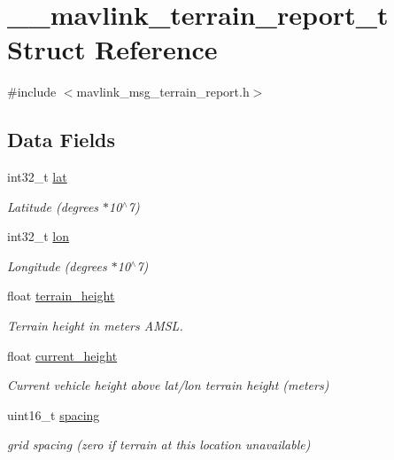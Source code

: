 \hypertarget{struct____mavlink__terrain__report__t}{\section{\+\_\+\+\_\+mavlink\+\_\+terrain\+\_\+report\+\_\+t Struct Reference}
\label{struct____mavlink__terrain__report__t}
}


{\ttfamily \#include $<$mavlink\+\_\+msg\+\_\+terrain\+\_\+report.\+h$>$}

\subsection*{Data Fields}
\begin{DoxyCompactItemize}
\item 
int32\+\_\+t \hyperlink{struct____mavlink__terrain__report__t_a06d28829a705a21947a4b7d69e957ee0}{lat}
\begin{DoxyCompactList}\small\item\em Latitude (degrees $\ast$10$^\wedge$7) \end{DoxyCompactList}\item 
int32\+\_\+t \hyperlink{struct____mavlink__terrain__report__t_ac19c0d14c4da7df455c55c51d52bc30d}{lon}
\begin{DoxyCompactList}\small\item\em Longitude (degrees $\ast$10$^\wedge$7) \end{DoxyCompactList}\item 
float \hyperlink{struct____mavlink__terrain__report__t_a3356e9c59dd79d7a9fdca0b545db9aa9}{terrain\+\_\+height}
\begin{DoxyCompactList}\small\item\em Terrain height in meters A\+M\+S\+L. \end{DoxyCompactList}\item 
float \hyperlink{struct____mavlink__terrain__report__t_a7f980f83f7e57ef6571ccdd84c205056}{current\+\_\+height}
\begin{DoxyCompactList}\small\item\em Current vehicle height above lat/lon terrain height (meters) \end{DoxyCompactList}\item 
uint16\+\_\+t \hyperlink{struct____mavlink__terrain__report__t_a66a81a4e33366a38e5d2c1c2c984587a}{spacing}
\begin{DoxyCompactList}\small\item\em grid spacing (zero if terrain at this location unavailable) \end{DoxyCompactList}\item 

\end{DoxyCompactItemize}
